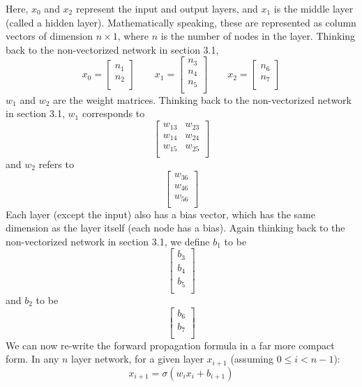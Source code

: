 \documentclass{article}
\begin{document}
Here, $x_0$ and $x_2$ represent the input and output layers, and $x_1$ is the middle layer (called a hidden layer). Mathematically speaking, these are represented as column vectors of dimension $n\times1$, where $n$ is the number of nodes in the layer. Thinking back to the non-vectorized network in section 3.1,
\[x_0 = 
\begin{bmatrix}
    n_{1}\\
    n_{2}\\
\end{bmatrix}
\qquad
x_1 = 
\begin{bmatrix}
    n_{3}\\
    n_{4}\\
    n_{5}\\
\end{bmatrix}
\qquad
x_2 = 
\begin{bmatrix}
    n_{6}\\
    n_{7}\\
\end{bmatrix}
\]
$w_1$ and $w_2$ are the weight matrices. Thinking back to the non-vectorized network in section 3.1, $w_1$ corresponds to
\[
\begin{bmatrix}
    w_{13}       & w_{23}\\
    w_{14}       & w_{24}\\
    w_{15}       & w_{25}\\
\end{bmatrix}
\]
and $w_2$ refers to
\[
\begin{bmatrix}
    w_{36}\\
    w_{46}\\
    w_{56}\\
\end{bmatrix}
\]
Each layer (except the input) also has a bias vector, which has the same dimension as the layer itself (each node has a bias). Again thinking back to the non-vectorized network in section 3.1, we define $b_1$ to be
\[
\begin{bmatrix}
    b_{3}\\
    b_{4}\\
    b_{5}\\
\end{bmatrix}
\]
and $b_2$ to be
\[
\begin{bmatrix}
    b_{6}\\
    b_{7}\\
\end{bmatrix}
\]
We can now re-write the forward propagation formula in a far more compact form. In any $n$ layer network, for a given layer $x_{i+1}$ (assuming $0\leq i<n-1$):
\[x_{i+1} = \sigma(w_ix_i + b_{i+1})\]
\end{document}
